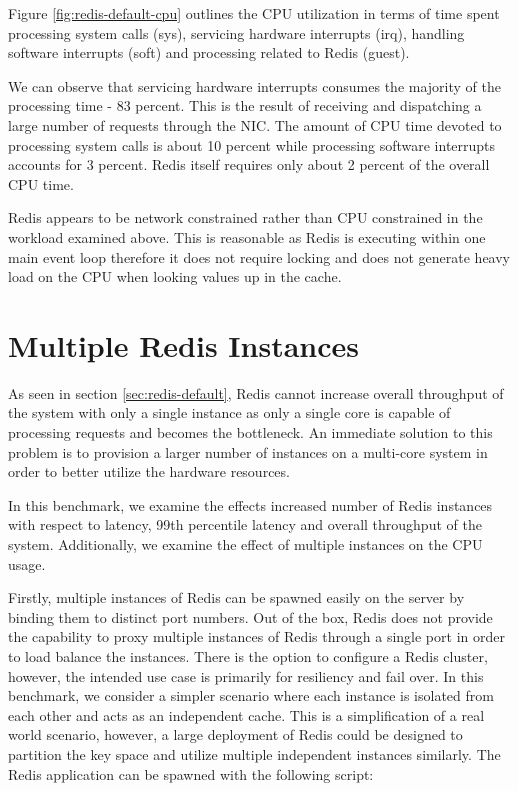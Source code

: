 Figure \ref{fig:redis-default-cpu} outlines the CPU utilization in terms of time spent processing system calls (sys), servicing hardware interrupts (irq), handling software interrupts (soft) and processing related to Redis (guest).

We can observe that servicing hardware interrupts consumes the majority of the processing time - 83 percent. This is the result of receiving and dispatching a large number of requests through the NIC. The amount of CPU time devoted to processing system calls is about 10 percent while processing software interrupts accounts for 3 percent. Redis itself requires only about 2 percent of the overall CPU time.

Redis appears to be network constrained rather than CPU constrained in the workload examined above. This is reasonable as Redis is executing within one main event loop therefore it does not require locking and does not generate heavy load on the CPU when looking values up in the cache.


\section{Multiple Redis Instances}
\label{sec:multiple-redis-instances}

As seen in section \ref{sec:redis-default}, Redis cannot increase overall throughput of the system with only a single instance as only a single core is capable of processing requests and becomes the bottleneck. An immediate solution to this problem is to provision a larger number of instances on a multi-core system in order to better utilize the hardware resources.

In this benchmark, we examine the effects increased number of Redis instances with respect to latency, 99th percentile latency and overall throughput of the system. Additionally, we examine the effect of multiple instances on the CPU usage.

Firstly, multiple instances of Redis can be spawned easily on the server by binding them to distinct port numbers. Out of the box, Redis does not provide the capability to proxy multiple instances of Redis through a single port in order to load balance the instances. There is the option to configure a Redis cluster, however, the intended use case is primarily for resiliency and fail over. In this benchmark, we consider a simpler scenario where each instance is isolated from each other and acts as an independent cache. This is a simplification of a real world scenario, however, a large deployment of Redis could be designed to partition the key space and utilize multiple independent instances similarly. The Redis application can be spawned with the following script:

